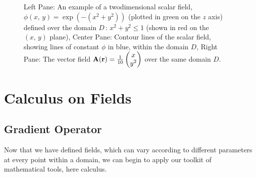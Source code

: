 \documentclass[letterpaper,10pt,english]{jupyterBook}
\begin{document}
\begin{figure}[htbp]
\centering
\capstart

\noindent{}
\caption{ Left Pane: An example of a two\sphinxhyphen{}dimensional scalar field, \(\phi(x,\, y) = \exp(-(x^2+y^2))\) (plotted in green on the \(z\) axis) defined
over the domain \(D\,:\,x^2 + y^2 \leq 1\) (shown in red on the \((x,\,y)\) plane),
 Center Pane: Contour lines of the scalar field, showing lines of constant \(\phi\) in blue, within the domain \(D\),
 Right Pane: The vector field \({\bf A(r)} = \frac{1}{10}\begin{pmatrix}
 x\\
 y^2
\end{pmatrix}\) over the same domain \(D\).}\label{\detokenize{VectorCalculus/calculusonfields:scalarvectorfield}}\end{figure}


\section{Calculus on Fields}
\label{\detokenize{VectorCalculus/calculusonfields:calculus-on-fields}}

\subsection{Gradient Operator}
\label{\detokenize{VectorCalculus/calculusonfields:gradient-operator}}
\sphinxAtStartPar
Now that we have defined fields, which can vary according to different parameters at every point within a domain, we can begin to apply
our toolkit of mathematical tools, here calculus.
\end{document}
